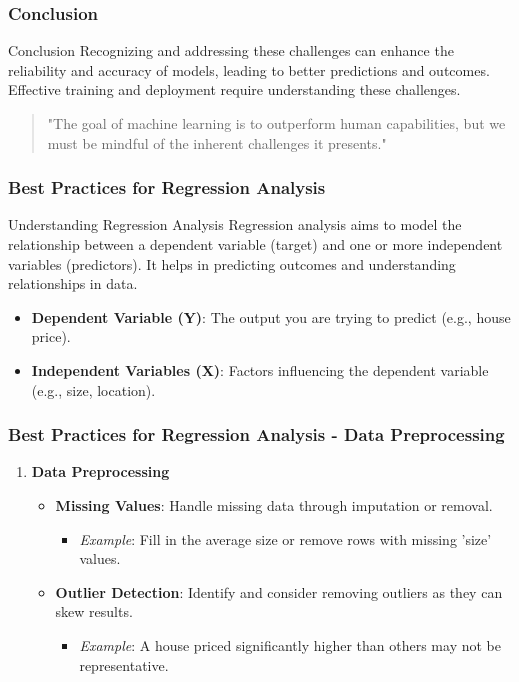 \documentclass[aspectratio=169]{beamer}
\begin{document}
\begin{frame}[fragile]
    \frametitle{Conclusion}
    \begin{block}{Conclusion}
        Recognizing and addressing these challenges can enhance the reliability and accuracy of models, leading to better predictions and outcomes. Effective training and deployment require understanding these challenges.
    \end{block}
    \begin{quote}
        "The goal of machine learning is to outperform human capabilities, but we must be mindful of the inherent challenges it presents."
    \end{quote}
\end{frame}

\begin{frame}[fragile]
    \frametitle{Best Practices for Regression Analysis}
    \begin{block}{Understanding Regression Analysis}
        Regression analysis aims to model the relationship between a dependent variable (target) and one or more independent variables (predictors). It helps in predicting outcomes and understanding relationships in data.
    \end{block}
    \begin{itemize}
        \item \textbf{Dependent Variable (Y)}: The output you are trying to predict (e.g., house price).
        \item \textbf{Independent Variables (X)}: Factors influencing the dependent variable (e.g., size, location).
    \end{itemize}
\end{frame}

\begin{frame}[fragile]
    \frametitle{Best Practices for Regression Analysis - Data Preprocessing}
    \begin{enumerate}
        \item \textbf{Data Preprocessing}
        \begin{itemize}
            \item \textbf{Missing Values}: Handle missing data through imputation or removal.
            \begin{itemize}
                \item \textit{Example}: Fill in the average size or remove rows with missing 'size' values.
            \end{itemize}
            \item \textbf{Outlier Detection}: Identify and consider removing outliers as they can skew results.
            \begin{itemize}
                \item \textit{Example}: A house priced significantly higher than others may not be representative.
            \end{itemize}
        \end{itemize}
    \end{enumerate}
\end{frame}
\end{document}
